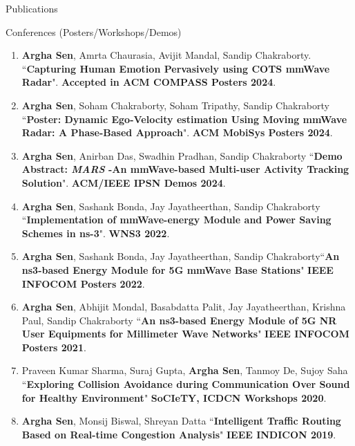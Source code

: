 \documentclass{resume} %
\begin{document}
\begin{rSection}{Publications}
\begin{rSubsection}{Conferences (Posters/Workshops/Demos)}{}{}{}
\begin{enumerate}
			\item \textbf{Argha Sen}, Amrta Chaurasia, Avijit Mandal, Sandip Chakraborty. ``\textbf{Capturing Human Emotion Pervasively using COTS mmWave Radar}". \textbf{Accepted in ACM COMPASS Posters 2024}.
			
			\item \textbf{Argha Sen}, Soham Chakraborty, Soham Tripathy, Sandip Chakraborty ``\textbf{Poster: Dynamic Ego-Velocity estimation Using Moving mmWave Radar: A Phase-Based Approach}". \textbf{ACM MobiSys Posters 2024}.
			
			\item \textbf{Argha Sen}, Anirban Das, Swadhin Pradhan, Sandip Chakraborty ``\textbf{Demo Abstract: \textit{MARS} -An mmWave-based Multi-user Activity Tracking Solution}". \textbf{ACM/IEEE IPSN Demos 2024}.
			
			\item \textbf{Argha Sen}, Sashank Bonda, Jay Jayatheerthan, Sandip Chakraborty ``\textbf{Implementation of mmWave-energy Module and Power Saving Schemes in ns-3}". \textbf{WNS3 2022}.
			
			\item \textbf{Argha Sen}, Sashank Bonda, Jay Jayatheerthan, Sandip Chakraborty``\textbf{An ns3-based Energy Module for 5G mmWave Base Stations}" \textbf{IEEE INFOCOM Posters 2022}.
			
			\item \textbf{Argha Sen}, Abhijit Mondal, Basabdatta Palit, Jay Jayatheerthan, Krishna Paul, Sandip Chakraborty ``\textbf{An ns3-based Energy Module of 5G NR User Equipments for Millimeter Wave Networks}" \textbf{IEEE INFOCOM Posters 2021}.
			
			\item Praveen Kumar Sharma, Suraj Gupta, \textbf{Argha Sen}, Tanmoy De, Sujoy Saha ``\textbf{Exploring Collision Avoidance during Communication Over Sound for Healthy Environment}" \textbf{SoCIeTY, ICDCN Workshops 2020}.
			
			\item \textbf{Argha Sen}, Monsij Biswal, Shreyan Datta ``\textbf{Intelligent Traffic Routing Based on Real-time Congestion Analysis}" \textbf{IEEE INDICON 2019}.
			
			\end{enumerate}
			
		\end{rSubsection}{}{}{}{}
		
	\end{rSection}
	
\end{document}
